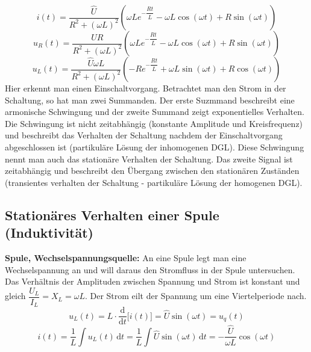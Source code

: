 \begin{equation}
\boxed{i\left(t\right)=\dfrac{\hat{U}}{R^2+\left(\omega L\right)^2}\left(\omega Le^{-\dfrac{Rt}{L}}-\omega L\cos\left(\omega t\right)+R\sin\left(\omega t\right)\right)}
\end{equation}
\begin{equation}
\boxed{u_R\left(t\right)=\dfrac{\hat{U}R}{R^2+\left(\omega L\right)^2}\left(\omega L e^{-\dfrac{Rt}{L}}-\omega L\cos\left(\omega t\right)+R\sin\left(\omega t\right)\right)}
\end{equation}
\begin{equation}
\boxed{u_L\left(t\right)=\dfrac{\hat{U}\omega L}{R^2+\left(\omega L\right)^2}\left(-R e^{-\dfrac{Rt}{L}}+\omega L\sin\left(\omega t\right)+R\cos\left(\omega t\right)\right)}
\end{equation}
Hier erkennt man einen Einschaltvorgang. Betrachtet man den Strom in der Schaltung, so hat man zwei Summanden. Der erste Suzmmand beschreibt eine armonische Schwingung und der zweite Summand zeigt exponentielles Verhalten. Die Schwingung ist nicht zeitabhängig (konstante Amplitude und Kreisfrequenz) und beschreibt das Verhalten der Schaltung nachdem der Einschaltvorgang abgeschlossen ist (partikuläre Lösung der inhomogenen DGL). Diese Schwingung nennt man auch das stationäre Verhalten der Schaltung. Das zweite Signal ist zeitabhängig und beschreibt den Übergang zwischen den stationären Zuständen (transientes verhalten der Schaltung - partikuläre Lösung der homogenen DGL).  
\subsection{Stationäres Verhalten einer Spule (Induktivität)}
\textbf{Spule, Wechselspannungsquelle:} An eine Spule legt man eine Wechselspannung an und will daraus den Stromfluss in der Spule untersuchen. Das Verhältnis der Amplituden zwischen Spannung und Strom ist konstant und gleich $\dfrac{U_L}{I_L}=X_L=\omega L$. Der Strom eilt der Spannung um eine Viertelperiode nach.
\begin{equation}
\boxed{u_L\left(t\right)=L\cdot \dfrac{\text{d}}{\text{d}t}\Big[i\left(t\right)\Big]=\hat{U}\sin\left(\omega t\right)=u_q\left(t\right)}
\end{equation}
\begin{equation}
\boxed{i\left(t\right)=\dfrac{1}{L}\displaystyle \int u_L\left(t\right)\,\text{d}t=\dfrac{1}{L}\displaystyle \int \hat{U}\sin\left(\omega t\right)\,\text{d}t=-\dfrac{\hat{U}}{\omega L}\cos\left(\omega t\right)}
\end{equation}
